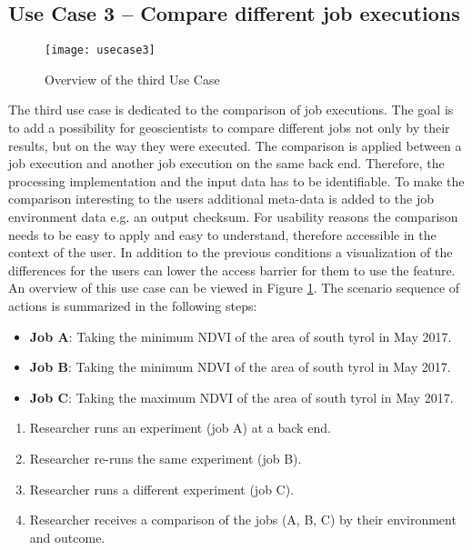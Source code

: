 \documentclass[draft,final]{vutinfth} %
\begin{document}
\subsection{Use Case 3 – Compare different job executions}\label{UseCase3}
\begin{figure}[h]
	\centering
	\texttt{[image: usecase3]}
	\caption{Overview of the third Use Case}
	\label{fig:usecase3} %
\end{figure}
The third use case is dedicated to the comparison of job executions. The goal is to add a possibility for geoscientists to compare different jobs not only by their results, but on the way they were executed. The comparison is applied between a job execution and another job execution on the same back end. Therefore, the processing implementation and the input data has to be identifiable. To make the comparison interesting to the users additional meta-data is added to the job environment data e.g. an output checksum. For usability reasons the comparison needs to be easy to apply and easy to understand, therefore accessible in the context of the user. In addition to the previous conditions a visualization of the differences for the users can lower the access barrier for them to use the feature. An overview of this use case can be viewed in Figure \ref{fig:usecase3}.
The scenario sequence of actions is summarized in the following steps: \\

\begin{itemize}
	\item \textbf{Job A}: Taking the minimum NDVI of the area of south tyrol in May 2017. 
	\item \textbf{Job B}: Taking the minimum NDVI of the area of south tyrol in May 2017.
	\item \textbf{Job C}: Taking the maximum NDVI of the area of south tyrol in May 2017.
\end{itemize}

\begin{enumerate}
	\item Researcher runs an experiment (job A) at a back end.
	\item Researcher re-runs the same experiment (job B).
	\item Researcher runs a different experiment (job C).   
	\item Researcher receives a comparison of the jobs (A, B, C) by their environment and outcome.
\end{enumerate}
\end{document}
